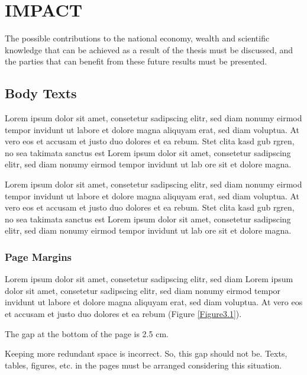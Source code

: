 \chapter{IMPACT}\label{ch:Ch3}
The possible contributions to the national economy, wealth and scientific knowledge that can be achieved as a result of the thesis must be discussed, and the parties that can benefit from these future results must be presented.

\section{Body Texts}

Lorem ipsum dolor sit amet, consetetur sadipscing elitr, sed diam nonumy eirmod tempor invidunt ut labore et dolore magna aliquyam erat, sed diam voluptua. At vero eos et accusam et justo duo dolores et ea rebum. Stet clita kasd gub rgren, no sea takimata sanctus est Lorem ipsum dolor sit amet, consetetur sadipscing elitr, sed diam nonumy eirmod tempor invidunt ut lab ore sit et dolore magna.

Lorem ipsum dolor sit amet, consetetur sadipscing elitr, sed diam nonumy eirmod tempor invidunt ut labore et dolore magna aliquyam erat, sed diam voluptua. At vero eos et accusam et justo duo dolores et ea rebum. Stet clita kasd gub rgren, no sea takimata sanctus est Lorem ipsum dolor sit amet, consetetur sadipscing elitr, sed diam nonumy eirmod tempor invidunt ut lab ore sit et dolore magna.
 
\subsection{Page Margins}

Lorem ipsum dolor sit amet, consetetur sadipscing elitr, sed diam Lorem ipsum dolor sit amet, consetetur sadipscing elitr, sed diam nonumy eirmod tempor invidunt ut labore et dolore magna aliquyam erat, sed diam voluptua. At vero eos et accusam et justo duo dolores et ea rebum (Figure \ref{Figure3.1}).

The gap at the bottom of the page is 2.5 cm. 

Keeping more redundant space is incorrect. So, this gap should not be. Texts, tables, figures, etc. in the pages must be arranged considering this situation.

